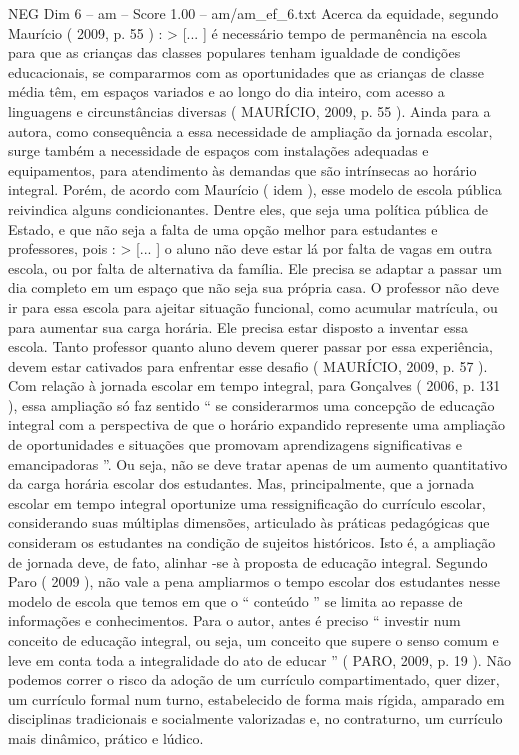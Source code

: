 \begin{textsample}{NEG Dim 6 – am – Score 1.00 – am/am\_ef\_6.txt}
Acerca da equidade, segundo Maurício ( 2009, p. 55 ) : > [... ] é necessário tempo de permanência na escola para que as crianças das classes populares tenham igualdade de condições educacionais, se compararmos com as oportunidades que as crianças de classe média têm, em espaços variados e ao longo do dia inteiro, com acesso a linguagens e circunstâncias diversas ( MAURÍCIO, 2009, p. 55 ).
Ainda para a autora, como consequência a essa necessidade de ampliação da jornada escolar, surge também a necessidade de espaços com instalações adequadas e equipamentos, para atendimento às demandas que são intrínsecas ao horário integral.
Porém, de acordo com Maurício ( idem ), esse modelo de escola pública reivindica alguns condicionantes.
Dentre eles, que seja uma política pública de Estado, e que não seja a falta de uma opção melhor para estudantes e professores, pois : > [... ] o aluno não deve estar lá por falta de vagas em outra escola, ou por falta de alternativa da família.
Ele precisa se adaptar a passar um dia completo em um espaço que não seja sua própria casa.
O professor não deve ir para essa escola para ajeitar situação funcional, como acumular matrícula, ou para aumentar sua carga horária.
Ele precisa estar disposto a inventar essa escola.
Tanto professor quanto aluno devem querer passar por essa experiência, devem estar cativados para enfrentar esse desafio ( MAURÍCIO, 2009, p. 57 ).
Com relação à jornada escolar em tempo integral, para Gonçalves ( 2006, p. 131 ), essa ampliação só faz sentido “ se considerarmos uma concepção de educação integral com a perspectiva de que o horário expandido represente uma ampliação de oportunidades e situações que promovam aprendizagens significativas e emancipadoras ”.
Ou seja, não se deve tratar apenas de um aumento quantitativo da carga horária escolar dos estudantes.
Mas, principalmente, que a jornada escolar em tempo integral oportunize uma ressignificação do currículo escolar, considerando suas múltiplas dimensões, articulado às práticas pedagógicas que consideram os estudantes na condição de sujeitos históricos.
Isto é, a ampliação de jornada deve, de fato, alinhar -se à proposta de educação integral.
Segundo Paro ( 2009 ), não vale a pena ampliarmos o tempo escolar dos estudantes nesse modelo de escola que temos em que o “ conteúdo ” se limita ao repasse de informações e conhecimentos.
Para o autor, antes é preciso “ investir num conceito de educação integral, ou seja, um conceito que supere o senso comum e leve em conta toda a integralidade do ato de educar ” ( PARO, 2009, p. 19 ).
Não podemos correr o risco da adoção de um currículo compartimentado, quer dizer, um currículo formal num turno, estabelecido de forma mais rígida, amparado em disciplinas tradicionais e socialmente valorizadas e, no contraturno, um currículo mais dinâmico, prático e lúdico.

\end{textsample}
